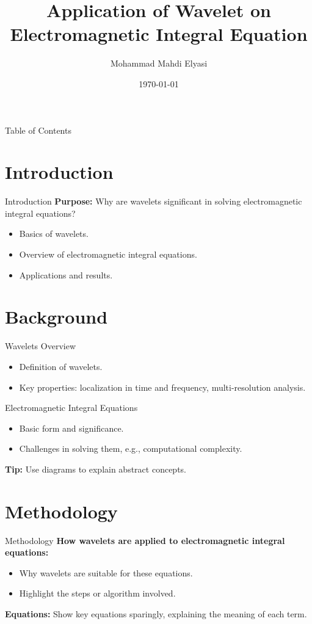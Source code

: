 \documentclass{beamer}
\title[Wavelet on Integral Equation]{Application of Wavelet on Electromagnetic Integral Equation}
\author[Mohammad Mahdi Elyasi]{Mohammad Mahdi Elyasi}
\institute[Amirkabir]{
    Supervisor: Dr. Moradi \\[1cm] %
    Faculty of Electrical Engineering \\ %
}
\date{\today} %
\begin{document}
\begin{frame}
    
    \titlepage
\end{frame}

\begin{frame}{Table of Contents}
    \tableofcontents
\end{frame}

\section{Introduction}
\begin{frame}{Introduction}
    \textbf{Purpose:} Why are wavelets significant in solving electromagnetic integral equations?
    \begin{itemize}
        \item Basics of wavelets.
        \item Overview of electromagnetic integral equations.
        \item Applications and results.
    \end{itemize}
\end{frame}

\section{Background}
\begin{frame}{Wavelets Overview}
    \begin{itemize}
        \item Definition of wavelets.
        \item Key properties: localization in time and frequency, multi-resolution analysis.
    \end{itemize}
\end{frame}

\begin{frame}{Electromagnetic Integral Equations}
    \begin{itemize}
        \item Basic form and significance.
        \item Challenges in solving them, e.g., computational complexity.
    \end{itemize}
    \textbf{Tip:} Use diagrams to explain abstract concepts.
\end{frame}

\section{Methodology}
\begin{frame}{Methodology}
    \textbf{How wavelets are applied to electromagnetic integral equations:}
    \begin{itemize}
        \item Why wavelets are suitable for these equations.
        \item Highlight the steps or algorithm involved.
    \end{itemize}
    \textbf{Equations:} Show key equations sparingly, explaining the meaning of each term.
\end{frame}
\end{document}

